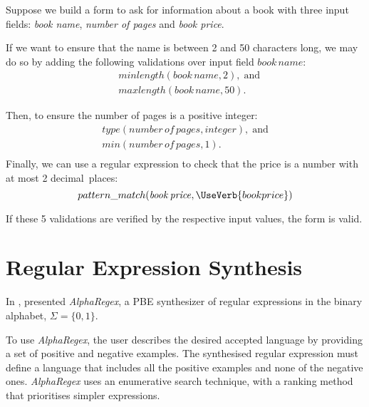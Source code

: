 \begin{example} \label{ex:book-validation}
\parindent0pt
Suppose we build a form to ask for information about a book with three input fields: \textit{book name}, \textit{number of pages} and \textit{book price}. 

If we want to ensure that the name is between 2 and 50 characters long, we may do so by adding the following validations over input field \(\mathit{book\,name}\):
\begin{equation*}
\begin{split}
    &minlength(\mathit{book\,name}, 2),\;\text{and}\\
    &maxlength(\mathit{book\,name}, 50).
\end{split}
\end{equation*}

Then, to ensure the number of pages is a positive integer:
\begin{equation*}
\begin{gathered}
    type(\mathit{number\,of\,pages}, integer),\;\text{and}\\
    min(\mathit{number\,of\,pages}, 1).\\
\end{gathered}
\end{equation*}
Finally, we can use a regular expression to check that the price is a number with at most 2 decimal~places:
\[pattern\_match(\mathit{book\,price}, \UseVerb{bookprice})\]

If these 5 validations are verified by the respective input values, the form is valid.
\end{example}


\section{Regular Expression Synthesis}
\label{sec:synth-predicates}
In \citeyear{DBLP:conf/gpce/LeeSO16}, \citeauthor{DBLP:conf/gpce/LeeSO16} \cite{DBLP:conf/gpce/LeeSO16} presented \textit{AlphaRegex}, a \ac{PBE} synthesizer of regular expressions in the binary alphabet, \(\Sigma = \{0, 1\}\).

To use \textit{AlphaRegex}, the user describes the desired accepted language by providing a set of positive and negative examples. The synthesised regular expression must define a language that includes all the positive examples and none of the negative ones.
\textit{AlphaRegex} uses an enumerative search technique, with a ranking method that prioritises simpler expressions.

